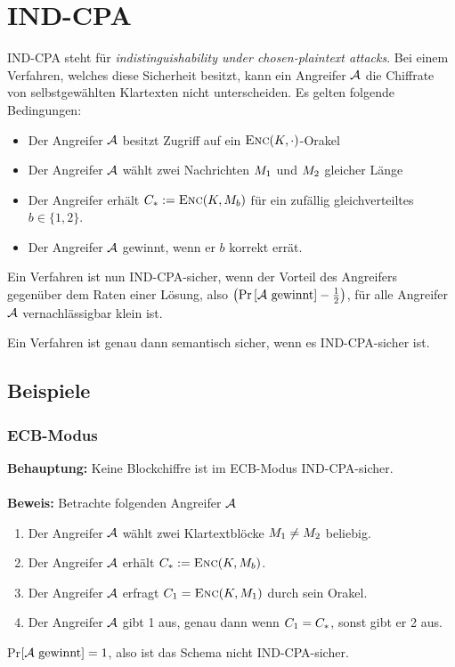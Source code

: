 \section{IND-CPA}
IND-CPA steht für \emph{indistinguishability under chosen-plaintext attacks}. Bei einem Verfahren, welches diese Sicherheit besitzt, kann ein Angreifer $\mathcal{A}$
die Chiffrate von selbstgewählten Klartexten nicht unterscheiden. Es gelten folgende Bedingungen:
\begin{itemize}
\item Der Angreifer $\mathcal{A}$ besitzt Zugriff auf ein $\textsc{Enc}(K,\cdot)$-Orakel
\item Der Angreifer $\mathcal{A}$ wählt zwei Nachrichten $M_1$ und $M_2$ gleicher Länge
\item Der Angreifer erhält $C_* := \textsc{Enc}(K, M_{b})$  für ein zufällig gleichverteiltes $b \in \{1, 2\}$.
\item Der Angreifer $\mathcal{A}$ gewinnt, wenn er $b$ korrekt errät.
\end{itemize}
Ein Verfahren ist nun IND-CPA-sicher, wenn der Vorteil des Angreifers gegenüber dem Raten einer Lösung, also $ \left( \text{Pr} \left[ \mathcal{A} \text{
gewinnt} \right] - \frac{1}{2} \right)$, für alle Angreifer $\mathcal{A}$ vernachlässigbar klein ist.
\vspace{10pt}

\begin{theorem}
Ein Verfahren ist genau dann semantisch sicher, wenn es IND-CPA-sicher ist.
\end{theorem}

\subsection{Beispiele}
\subsubsection{ECB-Modus}
\textbf{Behauptung:} Keine Blockchiffre ist im ECB-Modus IND-CPA-sicher.~\\\\
\textbf{Beweis:} Betrachte folgenden Angreifer $\mathcal{A}$
\begin{enumerate}[Schr{i}tt 1:]
    \item Der Angreifer $\mathcal{A}$ wählt zwei Klartextblöcke $M_1 \neq M_2$ beliebig.
    \item Der Angreifer $\mathcal{A}$ erhält $C_* := \textsc{Enc}(K, M_{b})$.
    \item Der Angreifer $\mathcal{A}$ erfragt $C_1 = \textsc{Enc}(K, M_1)$ durch sein Orakel.
    \item Der Angreifer $\mathcal{A}$ gibt 1 aus, genau dann wenn $C_1 = C_*$, sonst gibt er 2 aus.
\end{enumerate}
Pr$\left[ \mathcal{A} \text{ gewinnt} \right] = 1$, also ist das Schema nicht IND-CPA-sicher.

